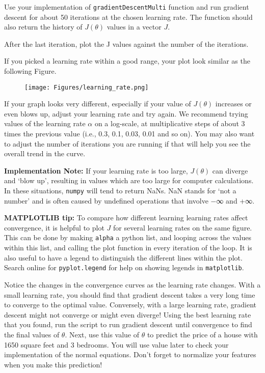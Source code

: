 \documentclass[11pt]{article}
\makeatletter
\def\maxwidth{\ifdim\Gin@nat@width>\linewidth\linewidth
    \else\Gin@nat@width\fi}
\let\Oldincludegraphics\includegraphics
\renewcommand{\includegraphics}[1]{\Oldincludegraphics[width=.8\maxwidth]{#1}}
\makeatother
\begin{document}
Use your implementation of \texttt{gradientDescentMulti} function and
run gradient descent for about 50 iterations at the chosen learning
rate. The function should also return the history of \(J(\theta)\)
values in a vector \(J\).

After the last iteration, plot the J values against the number of the
iterations.

If you picked a learning rate within a good range, your plot look
similar as the following Figure.

\begin{figure}
\centering
\texttt{[image: Figures/learning\_rate.png]}
\caption{}
\end{figure}

If your graph looks very different, especially if your value of
\(J(\theta)\) increases or even blows up, adjust your learning rate and
try again. We recommend trying values of the learning rate \(\alpha\) on
a log-scale, at multiplicative steps of about 3 times the previous value
(i.e., 0.3, 0.1, 0.03, 0.01 and so on). You may also want to adjust the
number of iterations you are running if that will help you see the
overall trend in the curve.

\textbf{Implementation Note:} If your learning rate is too large,
\(J(\theta)\) can diverge and `blow up', resulting in values which are
too large for computer calculations. In these situations, \texttt{numpy}
will tend to return NaNs. NaN stands for `not a number' and is often
caused by undefined operations that involve −∞ and +∞.

\textbf{MATPLOTLIB tip:} To compare how different learning learning
rates affect convergence, it is helpful to plot \(J\) for several
learning rates on the same figure. This can be done by making
\texttt{alpha} a python list, and looping across the values within this
list, and calling the plot function in every iteration of the loop. It
is also useful to have a legend to distinguish the different lines
within the plot. Search online for \texttt{pyplot.legend} for help on
showing legends in \texttt{matplotlib}.

Notice the changes in the convergence curves as the learning rate
changes. With a small learning rate, you should find that gradient
descent takes a very long time to converge to the optimal value.
Conversely, with a large learning rate, gradient descent might not
converge or might even diverge! Using the best learning rate that you
found, run the script to run gradient descent until convergence to find
the final values of \(\theta\). Next, use this value of \(\theta\) to
predict the price of a house with 1650 square feet and 3 bedrooms. You
will use value later to check your implementation of the normal
equations. Don't forget to normalize your features when you make this
prediction!
\end{document}
